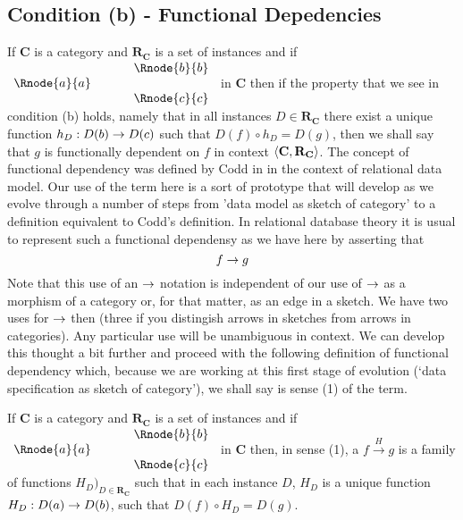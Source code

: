 \documentclass[10pt,a4paper]{article}
\theoremstyle{remark}
\newcommand{\catc}[1][C]{\textbf{#1}}
\newcommand{\reqt}{\textbf{R}}
\newcommand{\reqtc}[1][\catc]{\reqt_{#1}}
\newcommand{\fundep}[3]{#2 \xrightarrow{#1} #3}
\begin{document}
\subsection{Condition (b) - Functional Depedencies}
If $\catc$ is a category and $\reqtc$ is a set of instances and if
$
\begin{array}{c p{0.5cm} c  }
             &&   \Rnode{b}{b} \\[0.01cm]
\Rnode{a}{a} &&                \\[0.01cm] 
             &&   \Rnode{c}{c}         
\end{array} 
$
in $\catc$ 
then if the property that we see in condition (b) holds, namely 
that  in all instances $D \in \reqtc$ there exist a unique function $h_D : D(b) \rightarrow D(c)$ such that
$D(f) \circ h_D = D(g)$, then we shall say that $g$ is functionally dependent on $f$ in  context $\tuple{\catc,\reqtc}$.
The concept of functional dependency was defined by Codd in \cite{Codd} in the context of relational data model. 
Our use of the term here is a sort of prototype that will develop as we evolve through a number of steps from 'data model as sketch of category' to a definition equivalent to Codd's definition.  In relational database theory it is usual
to represent such a functional dependensy as we have here by asserting that 
$$
f \rightarrow g
$$
Note that this use of an $\rightarrow$ notation is independent of our use of $\rightarrow$ as a morphism of a category 
or, for that matter, as an edge in a sketch. We have two uses for $\rightarrow$ then (three if you distingish arrows in sketches from arrows in categories). Any particular use will be unambiguous in context. We can develop this thought a bit further and proceed with the following definition of functional dependency which, because we are 
working at this first stage of evolution (`data specification as sketch of category'), we shall say is sense (1)
of the term.
\begin{definition}
If $\catc$ is a category and $\reqtc$ is a set of instances and if
$
\begin{array}{c p{0.5cm} c  }
             &&   \Rnode{b}{b} \\[0.01cm]
\Rnode{a}{a} &&                \\[0.01cm] 
             &&   \Rnode{c}{c}         
\end{array} 
$
in $\catc$ 
then, in sense (1), a  $\fundep{H}{f}{g}$ is a family of functions $H_D)_{D \in \reqtc}$ such that in each instance $D$, $H_D$ is a unique function $H_D: D(a) \rightarrow D(b)$, such that $D(f) \circ H_D = D(g)$.
\end{definition}
\end{document}
